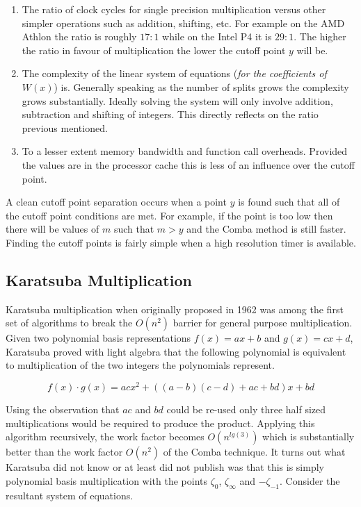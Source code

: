 \documentclass[b5paper]{book}
\begin{document}
\begin{enumerate}
\item  The ratio of clock cycles for single precision multiplication versus other simpler operations such as addition, shifting, etc.  For example
on the AMD Athlon the ratio is roughly $17 : 1$ while on the Intel P4 it is $29 : 1$.  The higher the ratio in favour of multiplication the lower
the cutoff point $y$ will be.  

\item  The complexity of the linear system of equations (\textit{for the coefficients of $W(x)$}) is.  Generally speaking as the number of splits
grows the complexity grows substantially.  Ideally solving the system will only involve addition, subtraction and shifting of integers.  This
directly reflects on the ratio previous mentioned.

\item  To a lesser extent memory bandwidth and function call overheads.  Provided the values are in the processor cache this is less of an
influence over the cutoff point.

\end{enumerate}

A clean cutoff point separation occurs when a point $y$ is found such that all of the cutoff point conditions are met.  For example, if the point
is too low then there will be values of $m$ such that $m > y$ and the Comba method is still faster.  Finding the cutoff points is fairly simple when
a high resolution timer is available.  

\subsection{Karatsuba Multiplication}
Karatsuba \cite{KARA} multiplication when originally proposed in 1962 was among the first set of algorithms to break the $O(n^2)$ barrier for
general purpose multiplication.  Given two polynomial basis representations $f(x) = ax + b$ and $g(x) = cx + d$, Karatsuba proved with 
light algebra \cite{KARAP} that the following polynomial is equivalent to multiplication of the two integers the polynomials represent.

\begin{equation}
f(x) \cdot g(x) = acx^2 + ((a - b)(c - d) + ac + bd)x + bd
\end{equation}

Using the observation that $ac$ and $bd$ could be re-used only three half sized multiplications would be required to produce the product.  Applying
this algorithm recursively, the work factor becomes $O(n^{lg(3)})$ which is substantially better than the work factor $O(n^2)$ of the Comba technique.  It turns 
out what Karatsuba did not know or at least did not publish was that this is simply polynomial basis multiplication with the points 
$\zeta_0$, $\zeta_{\infty}$ and $-\zeta_{-1}$.  Consider the resultant system of equations.
\end{document}
